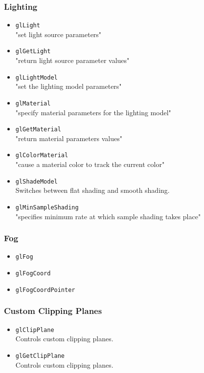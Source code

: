 \documentclass[12pt]{article}
\begin{document}
\subsubsection{Lighting}
\begin{itemize}
\item \texttt{glLight} \\
	"set light source parameters"
\item \texttt{glGetLight} \\
	"return light source parameter values"
\item \texttt{glLightModel} \\
	"set the lighting model parameters"
\item \texttt{glMaterial} \\
	"specify material parameters for the lighting model"
\item \texttt{glGetMaterial} \\
	"return material parameters values"
\item \texttt{glColorMaterial} \\
	"cause a material color to track the current color"
\item \texttt{glShadeModel} \\
	Switches between flat shading and smooth shading.
\item \texttt{glMinSampleShading} \\
	"specifies minimum rate at which sample shading takes place"
\end{itemize}

\subsubsection{Fog}
\begin{itemize}
\item \texttt{glFog}
\item \texttt{glFogCoord}
\item \texttt{glFogCoordPointer}
\end{itemize}

\subsubsection{Custom Clipping Planes}
\begin{itemize}
\item \texttt{glClipPlane} \\
	Controls custom clipping planes.
\item \texttt{glGetClipPlane} \\
	Controls custom clipping planes.
\end{itemize}
\end{document}
